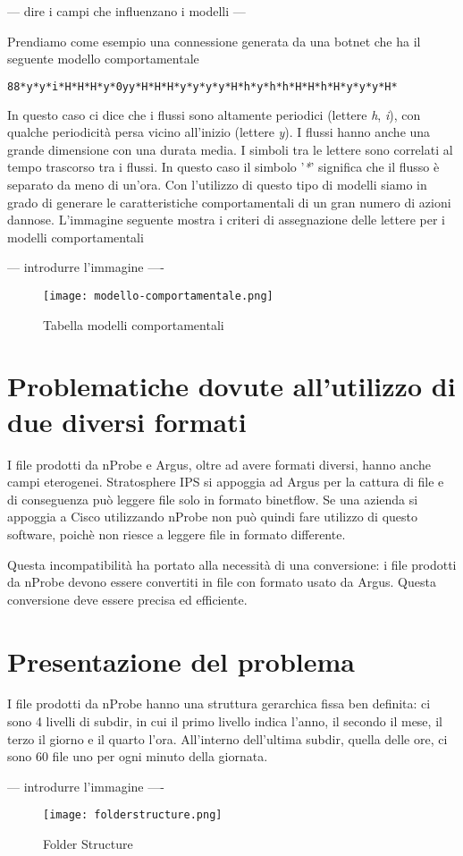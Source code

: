 \documentclass[../main.tex]{subfiles}
\begin{document}
--- dire i campi che influenzano i modelli ---

Prendiamo come esempio una connessione generata da una botnet che ha il seguente modello comportamentale
\begin{lstlisting}[language=bash]
88*y*y*i*H*H*H*y*0yy*H*H*H*y*y*y*y*H*h*y*h*h*H*H*h*H*y*y*y*H*
\end{lstlisting}

In questo caso ci dice che i flussi sono altamente periodici (lettere \textit{h}, \textit{i}), con qualche periodicità persa vicino all'inizio (lettere \textit{y}). I flussi hanno anche una grande dimensione con una durata media. I simboli tra le lettere sono correlati al tempo trascorso tra i flussi. In questo caso il simbolo '\textit{*}' significa che il flusso è separato da meno di un'ora.
Con l'utilizzo di questo tipo di modelli siamo in grado di generare le caratteristiche comportamentali di un gran numero di azioni dannose. L'immagine seguente mostra i criteri di assegnazione delle lettere per i modelli comportamentali \newline

--- introdurre l'immagine ----
\begin{figure}[H]
\centering
\texttt{[image: modello-comportamentale.png]}
				\caption{Tabella modelli comportamentali}
\end{figure}

\section{Problematiche dovute all'utilizzo di due diversi formati}
I file prodotti da nProbe e Argus, oltre ad avere formati diversi, hanno anche campi eterogenei. Stratosphere IPS si appoggia ad Argus per la cattura di file e di conseguenza può leggere file solo in formato binetflow. 
Se una azienda si appoggia a Cisco utilizzando nProbe non può quindi fare utilizzo di questo software, poichè non riesce a leggere file in formato differente.

Questa incompatibilità ha portato alla necessità di una conversione: i file prodotti da nProbe devono essere convertiti in file con formato usato da Argus. Questa conversione deve essere precisa ed efficiente.

\section{Presentazione del problema}
I file prodotti da nProbe hanno una struttura gerarchica fissa ben definita: ci sono 4 livelli di subdir, in cui il primo livello indica l'anno, il secondo il mese, il terzo il giorno e il quarto l'ora. All'interno dell'ultima subdir, quella delle ore, ci sono 60 file uno per ogni minuto della giornata.

--- introdurre l'immagine ----
\begin{figure}[H]
\centering
\texttt{[image: folderstructure.png]}
\caption{Folder Structure}
\end{figure}
\end{document}
